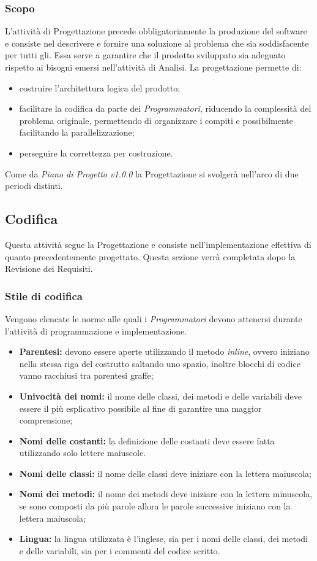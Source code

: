 \subsubsection{Scopo}
L'attività di Progettazione precede obbligatoriamente la produzione del software e consiste nel descrivere e fornire una soluzione al problema che sia soddisfacente per tutti gli. Essa serve a garantire che il prodotto sviluppato sia adeguato rispetto ai bisogni emersi nell'attività di Analisi. 
La progettazione permette di:
\begin{itemize}
	\item costruire l'architettura logica del prodotto;
	\item facilitare la codifica da parte dei \textit{Programmatori}, riducendo la complessità del problema originale, permettendo di organizzare i compiti e possibilmente facilitando la parallelizzazione;
	\item perseguire la correttezza per costruzione.
\end{itemize}
Come da \textit{Piano di Progetto v1.0.0} la Progettazione si svolgerà nell'arco di due periodi distinti. 

\subsection{Codifica}
Questa attività segue la Progettazione e consiste nell'implementazione effettiva di quanto precedentemente progettato.
Questa sezione verrà completata dopo la Revisione dei Requisiti.
\subsubsection{Stile di codifica}
Vengono elencate le norme alle quali i \textit{Programmatori} devono attenersi durante l'attività di programmazione e implementazione.
\begin{itemize}
	\item \textbf{Parentesi:} devono essere aperte utilizzando il metodo \textit{inline}, ovvero iniziano nella stessa riga del costrutto saltando uno spazio, inoltre blocchi di codice vanno racchiusi tra parentesi graffe;
	\item \textbf{Univocità dei nomi:} il nome delle classi, dei metodi e delle variabili deve essere il più esplicativo possibile al fine di garantire una maggior comprensione;
	\item \textbf{Nomi delle costanti:} la definizione delle costanti deve essere fatta utilizzando solo lettere maiuscole.
	\item \textbf{Nomi delle classi:} il nome delle classi deve iniziare con la lettera maiuscola;
	\item \textbf{Nomi dei metodi:} il nome dei metodi deve iniziare con la lettera minuscola, se sono composti da più parole allora le parole successive iniziano con la lettera maiuscola;
	\item \textbf{Lingua:} la lingua utilizzata è l'inglese, sia per i nomi delle classi, dei metodi e delle variabili, sia per i commenti del codice scritto.
\end{itemize}

